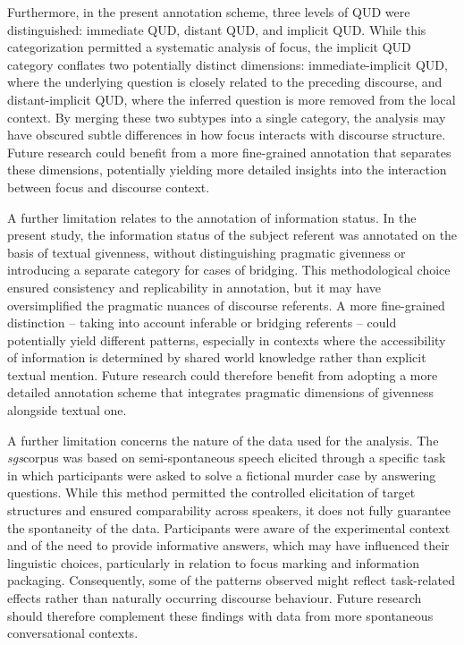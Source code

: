 Furthermore, in the present annotation scheme, three levels of QUD were distinguished: immediate QUD, distant QUD, and implicit QUD. While this categorization permitted a systematic analysis of focus, the implicit QUD category conflates two potentially distinct dimensions: immediate-implicit QUD, where the underlying question is closely related to the preceding discourse, and distant-implicit QUD, where the inferred question is more removed from the local context. By merging these two subtypes into a single category, the analysis may have obscured subtle differences in how focus interacts with discourse structure. Future research could benefit from a more fine-grained annotation that separates these dimensions, potentially yielding more detailed insights into the interaction between focus and discourse context.

A further limitation relates to the annotation of information status. In the present study, the information status of the subject referent was annotated on the basis of textual givenness, without distinguishing pragmatic givenness or introducing a separate category for cases of bridging. This methodological choice ensured consistency and replicability in annotation, but it may have oversimplified the pragmatic nuances of discourse referents. A more fine-grained distinction -- taking into account inferable or bridging referents -- could potentially yield different patterns, especially in contexts where the accessibility of information is determined by shared world knowledge rather than explicit textual mention. Future research could therefore benefit from adopting a more detailed annotation scheme that integrates pragmatic dimensions of givenness alongside textual one.

A further limitation concerns the nature of the data used for the analysis. The \textit{sgs}corpus \parencite{adli2011gradient} was based on semi-spontaneous speech elicited through a specific task in which participants were asked to solve a fictional murder case by answering questions. While this method permitted the controlled elicitation of target structures and ensured comparability across speakers, it does not fully guarantee the spontaneity of the data. Participants were aware of the experimental context and of the need to provide informative answers, which may have influenced their linguistic choices, particularly in relation to focus marking and information packaging. Consequently, some of the patterns observed might reflect task-related effects rather than naturally occurring discourse behaviour. Future research should therefore complement these findings with data from more spontaneous conversational contexts.

